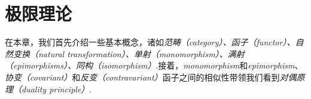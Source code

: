 \chapter{极限理论}
在本章，我们首先介绍一些基本概念，诸如\emph{范畴（category）、函子（functor）、自然变换（natural transformation）、单射（monomorphism）、满射（epimorphisms）、同构（isomorphism）}.接着，\emph{monomorphism}和\emph{epimorphism}、\emph{协变（covariant）}和\emph{反变（contravariant）}函子之间的相似性带领我们看到\emph{对偶原理（duality principle）}.
\minitoc
\newpage
